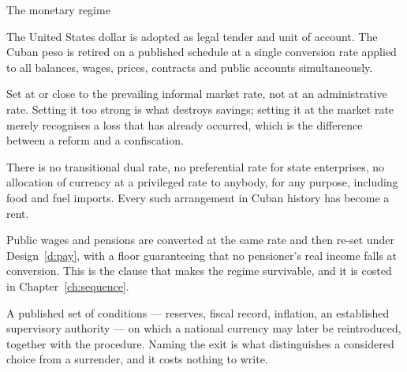 \begin{design}{The monetary regime}
\label{d:regime}
\begin{rules}
 The United States dollar is adopted as legal tender and unit of
account. The Cuban peso is retired on a published schedule at a single
conversion rate applied to all balances, wages, prices, contracts and public
accounts simultaneously.

 Set at or close to the prevailing informal market
rate, not at an administrative rate. Setting it too strong is what destroys
savings; setting it at the market rate merely recognises a loss that has already
occurred, which is the difference between a reform and a confiscation.

 There is no transitional dual rate, no
preferential rate for state enterprises, no allocation of currency at a
privileged rate to anybody, for any purpose, including food and fuel imports.
Every such arrangement in Cuban history has become a rent.

 Public wages and pensions are converted at
the same rate and then re-set under Design~\ref{d:pay}, with a floor guaranteeing
that no pensioner's real income falls at conversion. This is the clause that
makes the regime survivable, and it is costed in Chapter~\ref{ch:sequence}.

 A published set of conditions --- reserves, fiscal record,
inflation, an established supervisory authority --- on which a national currency
may later be reintroduced, together with the procedure. Naming the exit is what
distinguishes a considered choice from a surrender, and it costs nothing to
write.
\end{rules}
\end{design}

